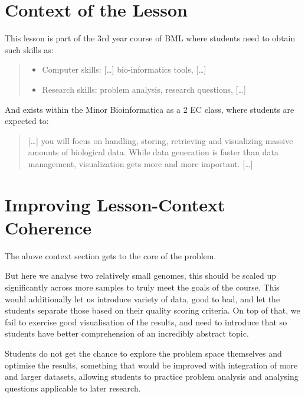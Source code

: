 \documentclass[paper=a4,justified,a4paper]{tufte-handout}
\providecommand{\tightlist}{%
  \setlength{\itemsep}{0pt}\setlength{\parskip}{0pt}}
\begin{document}
\hypertarget{context-of-the-lesson}{%
\section{Context of the Lesson}\label{context-of-the-lesson}}

This lesson is part of the 3rd year course of BML where students need to
obtain such skills as:

\begin{quote}
\begin{itemize}
\tightlist
\item
  Computer skills: {[}\ldots{}{]} bio-informatics tools, {[}\ldots{}{]}
\item
  Research skills: problem analysis, research questions, {[}\ldots{}{]}
\end{itemize}
\end{quote}

And exists within the Minor Bioinformatica as a 2 EC class, where
students are expected to:

\begin{quote}
{[}\ldots{}{]} you will focus on handling, storing, retrieving and
visualizing massive amounts of biological data. While data generation is
faster than data management, visualization gets more and more important.
{[}\ldots{}{]}
\end{quote}

\hypertarget{improving-lesson-context-coherence}{%
\section{Improving Lesson-Context
Coherence}\label{improving-lesson-context-coherence}}

The above context section gets to the core of the problem.

But here we analyse two relatively small genomes, this should be scaled
up significantly across more samples to truly meet the goals of the
course. This would additionally let us introduce variety of data, good
to bad, and let the students separate those based on their quality
scoring criteria. On top of that, we fail to exercise good visualisation
of the results, and need to introduce that so students have better
comprehension of an incredibly abstract topic.

Students do not get the chance to explore the problem space themselves
and optimise the results, something that would be improved with
integration of more and larger datasets, allowing students to practice
problem analysis and analysing questions applicable to later research.
\end{document}
